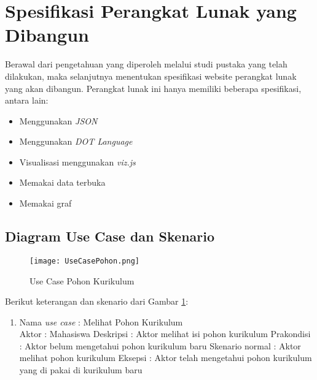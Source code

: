 \section{Spesifikasi Perangkat Lunak yang Dibangun}
\label{sec: Spesifikasi Perangkat Lunak yang Dibangun}

Berawal dari pengetahuan yang diperoleh melalui studi pustaka yang telah dilakukan, maka selanjutnya
menentukan spesifikasi website perangkat lunak yang akan dibangun. Perangkat lunak ini hanya
memiliki beberapa spesifikasi, antara lain:
\begin{itemize}
\item Menggunakan \textit{JSON} 
\item Menggunakan \textit{DOT Language}
\item Visualisasi menggunakan \textit{viz.js}
\item Memakai data terbuka
\item Memakai graf
\end{itemize}

\subsection{Diagram Use Case dan Skenario}
\label{sec: Diagram Use Case dan Skenario}

\begin{figure}[H]
		\centering
		\texttt{[image: UseCasePohon.png]}
		\caption{Use Case Pohon Kurikulum}
		\label{fig: Use Case Pohon Kurikulum}
\end{figure}	

Berikut keterangan dan skenario dari Gambar \ref{fig: Use Case Pohon Kurikulum}:
\begin{enumerate}
\item Nama \textit{use case} : Melihat Pohon Kurikulum \\
	  Aktor : Mahasiswa 
	  Deskripsi :  Aktor melihat isi pohon kurikulum 
	  Prakondisi : Aktor belum mengetahui pohon kurikulum baru 
	  Skenario normal : Aktor melihat pohon kurikulum
	  Eksepsi : Aktor telah mengetahui pohon kurikulum yang di pakai di kurikulum baru
	  
\end{enumerate}


